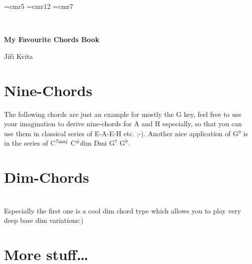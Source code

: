 \documentclass[12pt]{article}
\newcommand\mychords{
\def\chordsize{2.2mm}   %
\def\numfrets{7}
\font\fingerfont=cmr5  %
\font\namefont=cmr12    %
\font\fretposfont=cmr7  %
\def\dampsymbol{{\tiny$\scriptstyle\times$}} %
}
\begin{document}
\mychords

\pagestyle{empty}

{\Large
\begin{center}
{ \ }
\vskip5cm
\centerline{ \textbf{My Favourite Chords Book}}
\vskip10cm
Ji\v{r}\'{\i} Kvita
\end{center}
}
\newpage


\section{Nine-Chords}

The following chords are just an example for mostly the G key, feel free to use your imagination to derive nine-chords for A and H especially, so that you can use them in classical series of E-A-E-H etc. ;-). Another nice application of G${}^9$ is in the series of C${}^{7{\rm maj}}$ C${}^{\#}$dim Dmi G${}^7$ G${}^9$.




\section{Dim-Chords}
\\ Especially the first one is a cool dim chord type which allows you to play very deep base dim variations:)



\section{More stuff\ldots}
\end{document}
